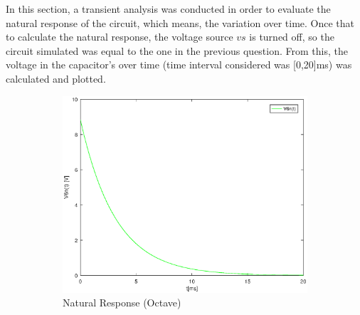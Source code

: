 In this section, a transient analysis was conducted in order to evaluate the natural response of the circuit, which means, the variation over time. Once that to calculate the natural response, the voltage source $vs$ is turned off, so the circuit simulated was equal to the one in the previous question. From this, the voltage in the capacitor's over time (time interval considered was [0,20]ms) was calculated and plotted.

\begin{figure}[h] \centering

\begin{subfigure}{0.4\textwidth}
\includegraphics[width=\textwidth]{NaturalResponse.eps}
\caption{Natural Response (Octave)}
\label{fig:first}
\end{subfigure}
\begin{subfigure}{0.4\textwidth}

\end{subfigure}
\end{figure}
